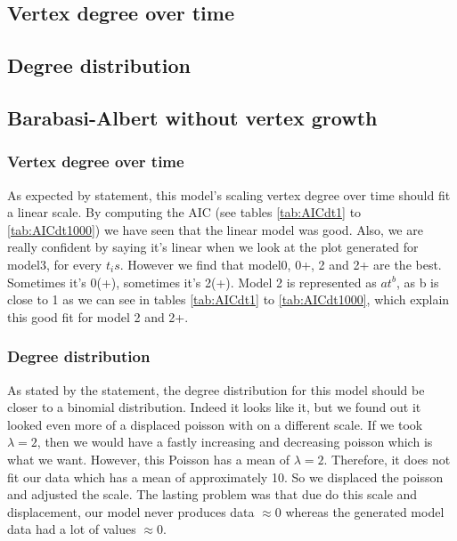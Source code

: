 \documentclass{article}
\begin{document}
\subsection{Vertex degree over time}

\subsection{Degree distribution}


\subsection{Barabasi-Albert without vertex growth}

\subsubsection{Vertex degree over time}

As expected by statement, this model's scaling vertex degree over time should 
fit a linear scale. By computing the AIC (see tables \ref{tab:AICdt1} to 
\ref{tab:AICdt1000}) we have seen that the linear model was good. Also, we are 
really confident by saying it's linear when we look at the plot generated for 
model3, for every $t_is$. However we find that model0, 0+, 2 and 2+ are the 
best. Sometimes it's 0(+), sometimes it's 2(+). Model 2 is represented as 
$at^b$, as b is close to 1 as we can see in tables \ref{tab:AICdt1} to 
\ref{tab:AICdt1000}, which explain this good fit for model 2 and 2+.

\subsubsection{Degree distribution}

As stated by the statement, the degree distribution for this model should be 
closer to a binomial distribution. Indeed it looks like it, but we found out it 
looked even more of a displaced poisson with on a different scale. If we took 
$\lambda = 2$, then we would have a fastly increasing and decreasing poisson 
which is what we want. However, this Poisson has a mean of $\lambda = 2$. 
Therefore, it does not fit our data which has a mean of approximately 10.
So we displaced the poisson and adjusted the scale. The lasting problem was that 
due do this scale and displacement, our model never produces data $\approx 0$ 
whereas the generated model data had a lot of values $\approx 0$.
\end{document}
